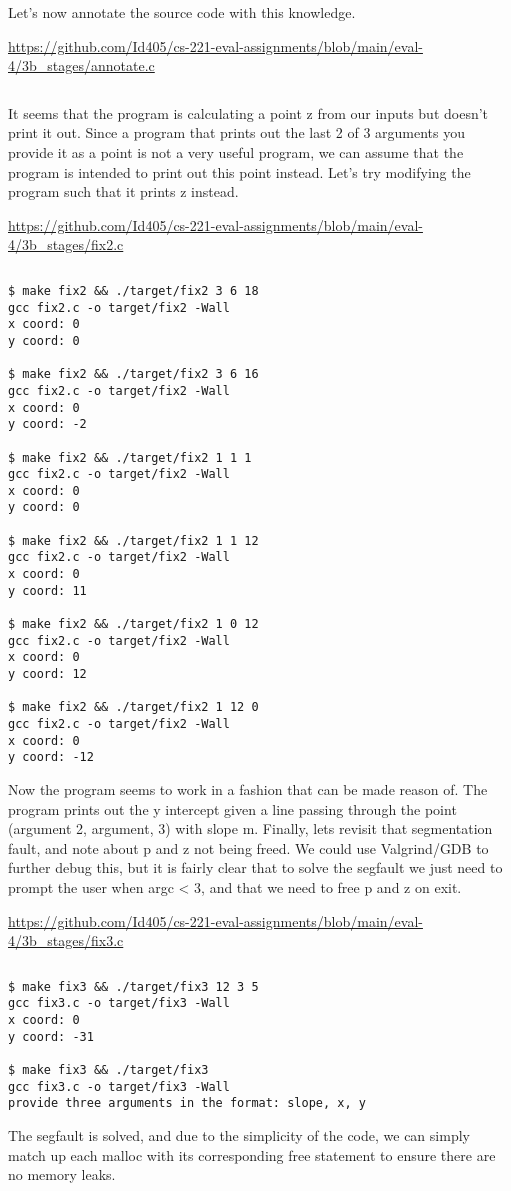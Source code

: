 \documentclass{article}
\newcommand{\nicecode}[2]{\inputminted[linenos=true,breaklines,fontsize=\small]{#1}{#2}}
\begin{document}
Let's now annotate the source code with this knowledge.
\vspace{2ex} \par
\url{https://github.com/Id405/cs-221-eval-assignments/blob/main/eval-4/3b_stages/annotate.c}
\nicecode{c}{3b_stages/annotate.c}
It seems that the program is calculating a point z from our inputs but doesn't print it out. Since a program that prints out the last 2 of 3 arguments you provide it as a point is not a very useful program, we can assume that the program is intended to print out this point instead. Let's try modifying the program such that it prints z instead.
\vspace{2ex} \par
\url{https://github.com/Id405/cs-221-eval-assignments/blob/main/eval-4/3b_stages/fix2.c}
\nicecode{c}{3b_stages/fix2.c}
\begin{verbatim}
$ make fix2 && ./target/fix2 3 6 18
gcc fix2.c -o target/fix2 -Wall
x coord: 0
y coord: 0

$ make fix2 && ./target/fix2 3 6 16
gcc fix2.c -o target/fix2 -Wall
x coord: 0
y coord: -2

$ make fix2 && ./target/fix2 1 1 1
gcc fix2.c -o target/fix2 -Wall
x coord: 0
y coord: 0

$ make fix2 && ./target/fix2 1 1 12
gcc fix2.c -o target/fix2 -Wall
x coord: 0
y coord: 11

$ make fix2 && ./target/fix2 1 0 12
gcc fix2.c -o target/fix2 -Wall
x coord: 0
y coord: 12

$ make fix2 && ./target/fix2 1 12 0
gcc fix2.c -o target/fix2 -Wall
x coord: 0
y coord: -12
\end{verbatim}
Now the program seems to work in a fashion that can be made reason of. The program prints out the y intercept given a line passing through the point (argument 2, argument, 3) with slope m.
Finally, lets revisit that segmentation fault, and note about p and z not being freed. We could use Valgrind/GDB to further debug this, but it is fairly clear that to solve the segfault we just need to prompt the user when argc < 3, and that we need to free p and z on exit.
\vspace{2ex} \par
\url{https://github.com/Id405/cs-221-eval-assignments/blob/main/eval-4/3b_stages/fix3.c}
\nicecode{c}{3b_stages/fix3.c}
\begin{verbatim}
$ make fix3 && ./target/fix3 12 3 5
gcc fix3.c -o target/fix3 -Wall
x coord: 0
y coord: -31

$ make fix3 && ./target/fix3
gcc fix3.c -o target/fix3 -Wall
provide three arguments in the format: slope, x, y
\end{verbatim}
The segfault is solved, and due to the simplicity of the code, we can simply match up each malloc with its corresponding free statement to ensure there are no memory leaks.

\newpage
\end{document}
